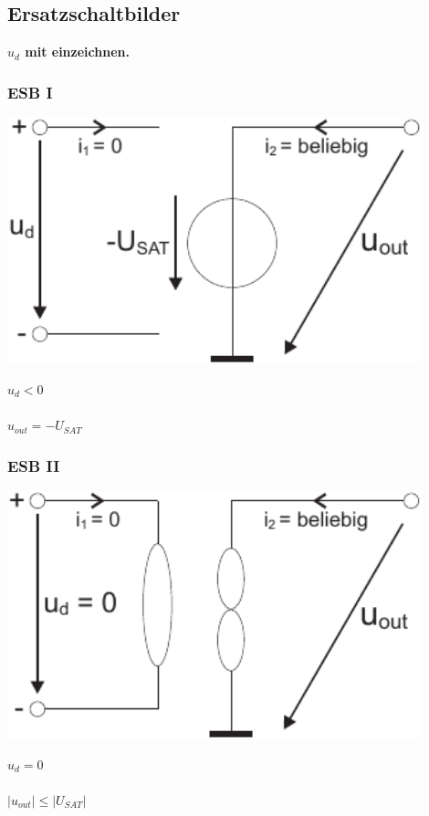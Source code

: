\documentclass[a4paper,twocolumn,10pt]{article}
\begin{document}
\subsection*{Ersatzschaltbilder}
\textbf{$u_d$ mit einzeichnen.}
\subsubsection*{ESB I}
\begin{minipage}[b]{0.3\textwidth}
\includegraphics[width=0.9\textwidth]{Grafiken/OP_ESBI}
\end{minipage}
\hfill
\begin{minipage}[b]{0.16\textwidth}
$u_d<0$\\\\
$u_{out}=-U_{SAT}$
\end{minipage}

\subsubsection*{ESB II}
\begin{minipage}[b]{0.3\textwidth}
\includegraphics[width=0.9\textwidth]{Grafiken/OP_ESBII}
\end{minipage}
\hfill
\begin{minipage}[b]{0.16\textwidth}
$u_d=0$\\\\
$|u_{out}|\leq |U_{SAT}|$
\end{minipage}
\end{document}

